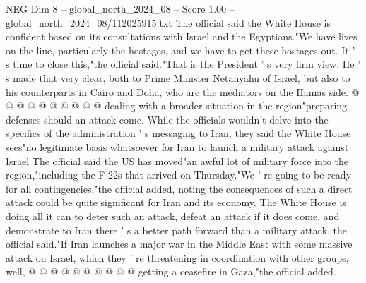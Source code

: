 \begin{textsample}{NEG Dim 8 – global\_north\_2024\_08 – Score 1.00 – global\_north\_2024\_08/112025915.txt}
The official said the White House is confident based on its consultations with Israel and the Egyptians."We have lives on the line, particularly the hostages, and we have to get these hostages out.
It ' s time to close this,"the official said."That is the President ' s very firm view.
He ' s made that very clear, both to Prime Minister Netanyahu of Israel, but also to his counterparts in Cairo and Doha, who are the mediators on the Hamas side. @ @ @ @ @ @ @ @ @ @ dealing with a broader situation in the region"preparing defenses should an attack come.
While the officials wouldn't delve into the specifics of the administration ' s messaging to Iran, they said the White House sees"no legitimate basis whatsoever for Iran to launch a military attack against Israel The official said the US has moved"an awful lot of military force into the region,"including the F-22s that arrived on Thursday."We ' re going to be ready for all contingencies,"the official added, noting the consequences of such a direct attack could be quite significant for Iran and its economy.
The White House is doing all it can to deter such an attack, defeat an attack if it does come, and demonstrate to Iran there ' s a better path forward than a military attack, the official said."If Iran launches a major war in the Middle East with some massive attack on Israel, which they ' re threatening in coordination with other groups, well, @ @ @ @ @ @ @ @ @ @ getting a ceasefire in Gaza,"the official added.

\end{textsample}
